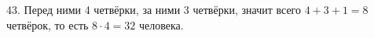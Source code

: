 43. Перед ними 4 четвёрки, за ними 3 четвёрки, значит всего $4+3+1=8$ четвёрок, то есть $8\cdot4=32$ человека.\\
